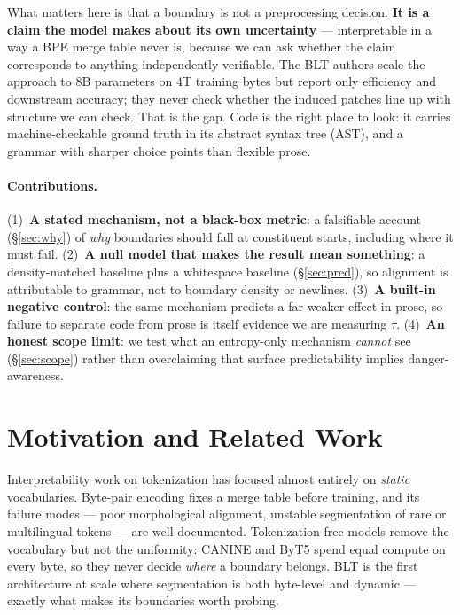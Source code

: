 What matters here is that a boundary is not a preprocessing decision. \textbf{It is a
claim the model makes about its own uncertainty} --- interpretable in a way a BPE merge
table never is, because we can ask whether the claim corresponds to anything independently
verifiable. The BLT authors scale the approach to 8B parameters on 4T training bytes but
report only efficiency and downstream accuracy; they never check whether the induced
patches line up with structure we can check. That is the gap. Code is the right place to
look: it carries machine-checkable ground truth in its abstract syntax tree (AST), and a
grammar with sharper choice points than flexible prose.

\paragraph{Contributions.} (1)~\textbf{A stated mechanism, not a black-box metric}: a
falsifiable account (\S\ref{sec:why}) of \emph{why} boundaries should fall at constituent
starts, including where it must fail. (2)~\textbf{A null model that makes the result mean
something}: a density-matched baseline plus a whitespace baseline (\S\ref{sec:pred}), so
alignment is attributable to grammar, not to boundary density or newlines. (3)~\textbf{A
built-in negative control}: the same mechanism predicts a far weaker effect in prose, so
failure to separate code from prose is itself evidence we are measuring $\tau$.
(4)~\textbf{An honest scope limit}: we test what an entropy-only mechanism \emph{cannot}
see (\S\ref{sec:scope}) rather than overclaiming that surface predictability implies
danger-awareness.

\section{Motivation and Related Work}

Interpretability work on tokenization has focused almost entirely on \emph{static}
vocabularies. Byte-pair encoding \citep{sennrich2016bpe} fixes a merge table before
training, and its failure modes --- poor morphological alignment, unstable segmentation of
rare or multilingual tokens --- are well documented. Tokenization-free models remove the
vocabulary but not the uniformity: CANINE \citep{clark2022canine} and ByT5
\citep{xue2022byt5} spend equal compute on every byte, so they never decide \emph{where} a
boundary belongs. BLT is the first architecture at scale where segmentation is both
byte-level and dynamic --- exactly what makes its boundaries worth probing.

